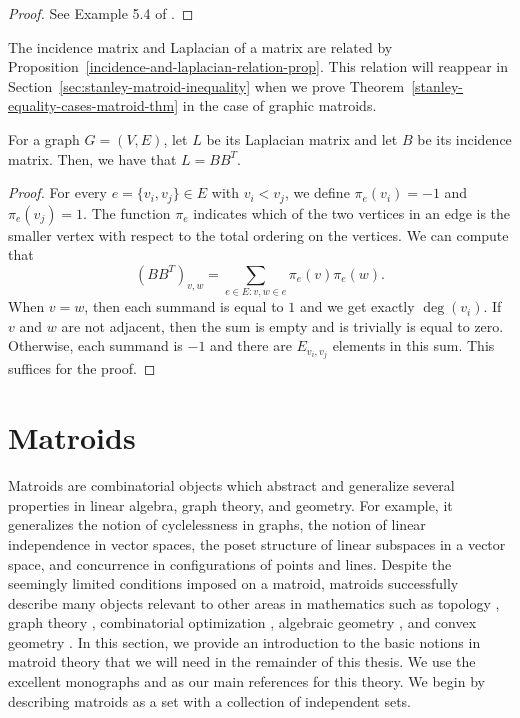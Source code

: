 \documentclass{puthesis-UG}
\begin{document}
\begin{proof}
	See Example 5.4 of \cite{bapat_raghavan_1997}. 
\end{proof}

The incidence matrix and Laplacian of a matrix are related by Proposition~\ref{incidence-and-laplacian-relation-prop}. This relation will reappear in Section~\ref{sec:stanley-matroid-inequality} when we prove Theorem~\ref{stanley-equality-cases-matroid-thm} in the case of graphic matroids. 

\begin{prop} \label{incidence-and-laplacian-relation-prop}
	For a graph $G = (V, E)$, let $L$ be its Laplacian matrix and let $B$ be its incidence matrix. Then, we have that $L = BB^T$. 
\end{prop}

\begin{proof}
	For every $e = \{v_i, v_j\} \in E$ with $v_i < v_j$, we define $\pi_e(v_i) = -1$ and $\pi_e (v_j) = 1$. The function $\pi_e$ indicates which of the two vertices in an edge is the smaller vertex with respect to the total ordering on the vertices. We can compute that 
	\[
		\left ( BB^T \right )_{v, w} = \sum_{e \in E : v, w \in e} \pi_e(v) \pi_e(w). 
	\]
	When $v = w$, then each summand is equal to $1$ and we get exactly $\deg (v_i)$. If $v$ and $w$ are not adjacent, then the sum is empty and is trivially is equal to zero. Otherwise, each summand is $-1$ and there are $E_{v_i, v_j}$ elements in this sum. This suffices for the proof. 
\end{proof}

\section{Matroids} \label{sec:matroids}

Matroids are combinatorial objects which abstract and generalize several properties in linear algebra, graph theory, and geometry. For example, it generalizes the notion of cyclelessness in graphs, the notion of linear independence in vector spaces, the poset structure of linear subspaces in a vector space, and concurrence in configurations of points and lines. Despite the seemingly limited conditions imposed on a matroid, matroids successfully describe many objects relevant to other areas in mathematics such as topology \cite{gelfand}, graph theory \cite{milnor-numbers}, combinatorial optimization \cite{optimization}, algebraic geometry \cite{schubert-cell}, and convex geometry \cite{matroid-polytope}. In this section, we provide an introduction to the basic notions in matroid theory that we will need in the remainder of this thesis. We use the excellent monographs \cite{10.5555/1197093} and \cite{welsh} as our main references for this theory. We begin by describing matroids as a set with a collection of independent sets. 
\end{document}
